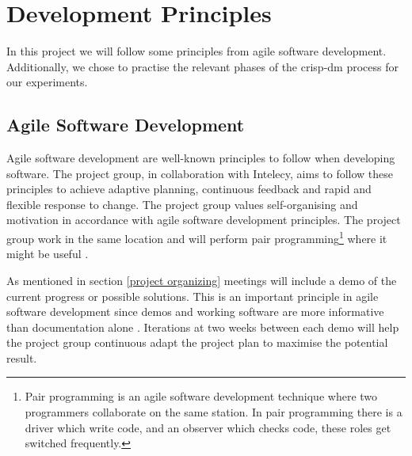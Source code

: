 \documentclass[english, a4paper]{report}
\begin{document}
{    \section{Development Principles}
    {
        In this project we will follow some principles from agile software development. Additionally, we chose to practise the relevant phases of the \acrfull{crisp-dm} process for our experiments.

        \subsection{Agile Software Development}\label{agileSoftwareDevlopment}
        {
            Agile software development are well-known principles to follow when developing software. The project group, in collaboration with Intelecy, aims to follow these principles to achieve adaptive planning, continuous feedback and rapid and flexible response to change. The project group values self-organising and motivation in accordance with agile software development principles. The project group work in the same location and will perform pair programming\footnote{Pair programming is an agile software development  technique where two programmers collaborate on the same station. In pair programming there is a driver which write code, and an observer which checks code, these roles get switched frequently.} where it might be useful \cite{whyAgile}.
            \par 
            As mentioned in section \ref{project organizing} meetings will include a demo of the current progress or possible solutions. This is an important principle in agile software development since demos and working software are more informative than documentation alone \cite{whyAgile}. 
            Iterations at two weeks between each demo will help the project group continuous adapt the project plan to maximise the potential result. 
        }
        
}}
\end{document}
